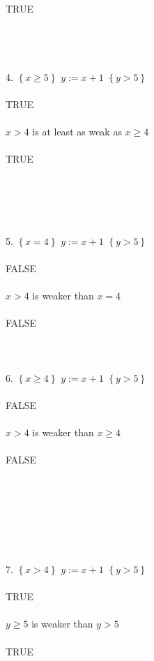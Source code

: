 \documentclass{article}
\begin{document}
\\
TRUE
\\
\\
\\
\\
\\
4. $\left\{x \geq 5\right\}$ $y := x + 1$ $\left\{y > 5\right\}$
\\
\\
TRUE
\\
\\
$x > 4$ is at least as weak as $ x \geq 4$
\\
\\
TRUE
\\
\\
\\
\\
\\
\\
5. $\left\{x = 4\right\}$ $y :=x + 1$ $\left\{y > 5\right\}$
\\
\\
FALSE
\\
\\
$x > 4$ is weaker than $ x = 4$
\\
\\
FALSE
\\
\\
\\
\\
6. $\left\{x \geq 4\right\}$ $y := x + 1$ $\left\{y > 5\right\}$
\\
\\
FALSE
\\
\\
$x > 4$ is weaker than $ x \geq 4$
\\
\\
FALSE
\\
\\
\\
\\
\\
\\
\\
\\
7. $\left\{x > 4\right\}$ $y := x + 1$ $\left\{y > 5\right\}$
\\
\\
TRUE
\\
\\
$y \geq 5$ is weaker than $y > 5$
\\
\\
TRUE
\\
\\
\\
\\
\\
\\
\\
\\
\\
\\
\\
\\
\\
\\
\end{document}

